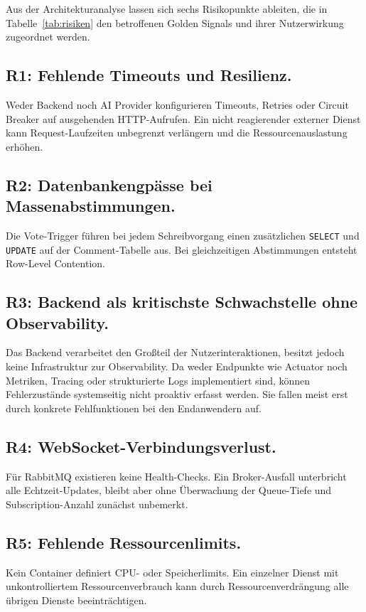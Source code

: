 Aus der Architekturanalyse lassen sich sechs Risikopunkte ableiten, die in Tabelle~\ref{tab:risiken} den betroffenen Golden Signals und ihrer Nutzerwirkung zugeordnet werden.

\subsection{R1: Fehlende Timeouts und Resilienz.}
Weder Backend noch AI Provider konfigurieren Timeouts, Retries oder Circuit Breaker auf ausgehenden HTTP-Aufrufen. Ein nicht reagierender externer Dienst kann Request-Laufzeiten unbegrenzt verlängern und die Ressourcenauslastung erhöhen.

\subsection{R2: Datenbankengpässe bei Massenabstimmungen.}
Die Vote-Trigger führen bei jedem Schreibvorgang einen zusätzlichen \texttt{SELECT} und \texttt{UPDATE} auf der Comment-Tabelle aus. Bei gleichzeitigen Abstimmungen entsteht Row-Level Contention.

\subsection{R3: Backend als kritischste Schwachstelle ohne Observability.}
Das Backend verarbeitet den Großteil der Nutzerinteraktionen, besitzt jedoch keine Infrastruktur zur Observability. Da weder Endpunkte wie Actuator noch Metriken, Tracing oder strukturierte Logs implementiert sind, können Fehlerzustände systemseitig nicht proaktiv erfasst werden. Sie fallen meist erst durch konkrete Fehlfunktionen bei den Endanwendern auf.

\subsection{R4: WebSocket-Verbindungsverlust.}
Für RabbitMQ existieren keine Health-Checks. Ein Broker-Ausfall unterbricht alle Echtzeit-Updates, bleibt aber ohne Überwachung der Queue-Tiefe und Subscription-Anzahl zunächst unbemerkt.

\subsection{R5: Fehlende Ressourcenlimits.}
Kein Container definiert CPU- oder Speicherlimits. Ein einzelner Dienst mit unkontrolliertem Ressourcenverbrauch kann durch Ressourcenverdrängung alle übrigen Dienste beeinträchtigen.

